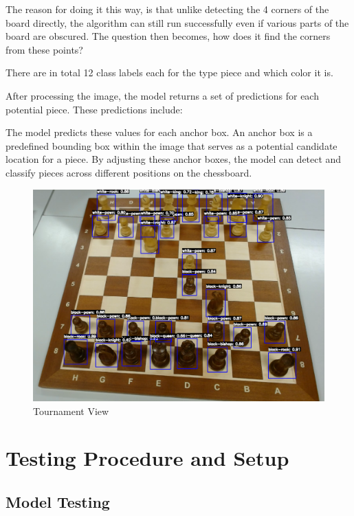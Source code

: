 The reason for doing it this way, is that unlike detecting the 4 corners of the board directly, the algorithm can still run successfully even if various parts of the board are obscured. The question then becomes, how does it find the corners from these points?


There are in total 12 class labels each for the type piece and which color it is.

After processing the image, the model returns a set of predictions for each potential piece. These predictions include:

The model predicts these values for each anchor box. An anchor box is a predefined bounding box within the image that serves as a potential candidate location for a piece. By adjusting these anchor boxes, the model can detect and classify pieces across different positions on the chessboard.

\begin{subfigure}[h!]{0.9\linewidth} \centering \includegraphics[width=\linewidth]{figures/methods/ml-models/piece-model.png} \caption{Tournament View} \end{subfigure}

\newpage

\section{Testing Procedure and Setup}

\subsection*{Model Testing}

